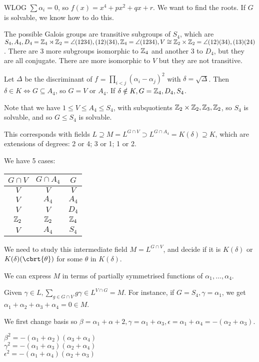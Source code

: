 \documentclass[a4paper, 10pt, twocolumn]{amsart}
\begin{document}
WLOG $\sum \alpha_i = 0$, so $f(x) = x^4 + px^2+ qx+r$. We want to find the roots. If $G$ is solvable, we know how to do this.

The possible Galois groups are transitive subgroups of $S_4$, which are $S_4, A_4, D_4 = \mathbb{Z}_4 \rtimes \mathbb{Z}_2 = \angle{(1234),(12)(34)}, \mathbb{Z}_4 = \angle{(1234)}, V \cong \mathbb{Z}_2 \times \mathbb{Z}_2 = \angle{(12)(34), (13)(24)}$. There are $3$ more subgroups isomorphic to $\mathbb{Z}_4$ and another $3$ to $D_4$, but they are all conjugate. There are more isomorphic to $V$ but they are not transitive.

Let $\Delta$ be the discriminant of $f$ = $\prod_{i<j} (\alpha_i-\alpha_j)^2$ with $\delta = \sqrt{\Delta}$. Then $\delta \in K \iff G \subseteq A_4$, so $G = V$ or $A_4$. If $\delta \notin K, G = \mathbb{Z}_4, D_4, S_4$.

Note that we have $1 \leq V \leq A_4 \leq S_4$, with subquotients $\mathbb{Z}_2 \times \mathbb{Z}_2, \mathbb{Z}_3, \mathbb{Z}_2$, so $S_4$ is solvable, and so $G \leq S_4$ is solvable. 

This corresponds with fields $L \supseteq M = L^{G \cap  V} \supset L^{G \cap A_4} = K(\delta) \supseteq K$, which are extensions of degrees: 2 or 4; 3 or 1; 1 or 2.

We have 5 cases:
\begin{tabular}{c|c|c}
$G\cap V$ & $G \cap A_4$ & $G$ \\\hline
$V$&$V$&$V$\\
$V$&$A_4$&$A_4$\\
$V$&$V$&$D_4$\\
$\mathbb{Z}_2$&$\mathbb{Z}_2$&$\mathbb{Z}_4$\\
$V$&$A_4$&$S_4$
\end{tabular}

We need to study this intermediate field $M = L^{G \cap V}$, and decide if it is $K(\delta)$ or $K(\delta)(\cbrt{\theta})$ for some $\theta$ in $K(\delta)$.

We can express $M$ in terms of partially symmetrised functions of $\alpha_1, \ldots, \alpha_4$.

Given $\gamma \in L, \sum_{g \in G \cap V} g\gamma \in L^{V \cap G} = M$. For instance, if $G = S_4, \gamma= \alpha_1$, we get $\alpha_1+\alpha_2+\alpha_3+\alpha_4 = 0 \in M$.

We first change basis so $\beta = \alpha_1+\alpha+2, \gamma = \alpha_1+\alpha_3, \epsilon = \alpha_1+ \alpha_4 = -(\alpha_2+\alpha_3)$.

$\beta^2 = -(\alpha_1+\alpha_2)(\alpha_3+\alpha_4)$\\
$\gamma^2 = -(\alpha_1+\alpha_3)(\alpha_2+\alpha_4)$\\
$\epsilon^2 = -(\alpha_1+\alpha_4)(\alpha_2+\alpha_3)$
\end{document}
